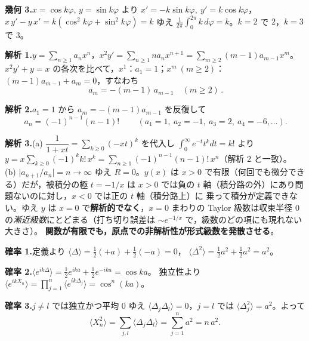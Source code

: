 \documentclass[dvipdfmx, uplatex]{jsarticle}
\theoremstyle{definition}
\begin{document}
\smallskip
\noindent\textbf{幾何 3.}\quad $x=\cos k\varphi,\,y=\sin k\varphi$ より $x'=-k\sin k\varphi,\ y'=k\cos k\varphi$，
$x\,y'-y\,x'=k(\cos^2 k\varphi+\sin^2 k\varphi)=k$ ゆえ
$\tfrac1{2\pi}\int_0^{2\pi}k\,d\varphi=k$。$k=2$ で $\boxed{2}$，$k=3$ で $\boxed{3}$。

\bigskip
\noindent\textbf{解析 1.}\quad $y=\sum_{n\ge1}a_nx^n$，$x^2y'=\sum_{n\ge1}n a_n x^{n+1}=\sum_{m\ge2}(m-1)a_{m-1}x^m$。
$x^2y'+y=x$ の各次を比べて，$x^1$：$\boxed{a_1=1}$；$x^m\ (m\ge2)$：$(m-1)a_{m-1}+a_m=0$，すなわち
\[
    \boxed{\,a_m=-(m-1)\,a_{m-1}\quad(m\ge2)\,}.
\]

\smallskip
\noindent\textbf{解析 2.}\quad $a_1=1$ から $a_m=-(m-1)a_{m-1}$ を反復して
\[
    \boxed{\,a_n=(-1)^{n-1}(n-1)!\,}\qquad(a_1=1,\ a_2=-1,\ a_3=2,\ a_4=-6,\dots).
\]

\smallskip
\noindent\textbf{解析 3.}\quad (a) $\dfrac{1}{1+xt}=\sum_{k\ge0}(-xt)^k$ を代入し $\int_0^\infty e^{-t}t^k dt=k!$ より
$y=x\sum_{k\ge0}(-1)^k k!\,x^k=\boxed{\sum_{n\ge1}(-1)^{n-1}(n-1)!\,x^n}$（解析 2 と一致）。
(b) $\bigl|a_{n+1}/a_n\bigr|=n\to\infty$ ゆえ $\boxed{R=0}$。$y(x)$ は $x>0$ で有限（何回でも微分できる）だが，被積分の極
$t=-1/x$ は $x>0$ では負の $t$ 軸（積分路の外）にあり問題ないのに対し，$x<0$ では正の $t$ 軸（積分路上）に
乗って積分が定義できない。ゆえ $y$ は $x=0$ で\textbf{解析的でなく}，$x=0$ まわりの Taylor 級数は収束半径
$0$ の\emph{漸近級数}にとどまる（打ち切り誤差は $\sim e^{-1/x}$ で，級数のどの項にも現れない大きさ）。
\textbf{関数が有限でも，原点での非解析性が形式級数を発散させる}。

\bigskip
\noindent\textbf{確率 1.}\quad 定義より $\langle\Delta\rangle=\tfrac12(+a)+\tfrac12(-a)=\boxed{0}$，
$\langle\Delta^2\rangle=\tfrac12a^2+\tfrac12a^2=\boxed{a^2}$。

\smallskip
\noindent\textbf{確率 2.}\quad $\langle e^{ik\Delta}\rangle=\tfrac12 e^{ika}+\tfrac12 e^{-ika}=\boxed{\cos ka}$。
独立性より $\langle e^{ikX_n}\rangle=\prod_{j=1}^n\langle e^{ik\Delta_j}\rangle=\boxed{\cos^n(ka)}$。

\smallskip
\noindent\textbf{確率 3.}\quad $j\neq l$ では独立かつ平均 $0$ ゆえ $\langle\Delta_j\Delta_l\rangle=0$，$j=l$ では
$\langle\Delta_j^2\rangle=a^2$。よって
\[
    \langle X_n^2\rangle=\sum_{j,l}\langle\Delta_j\Delta_l\rangle=\sum_{j=1}^n a^2=\boxed{n\,a^2}.
\]
\end{document}
